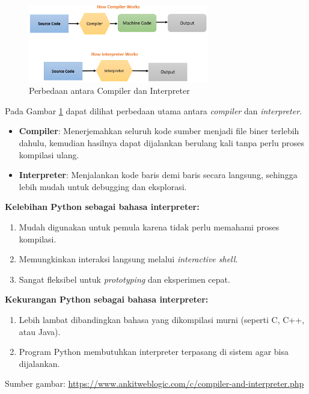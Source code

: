 \begin{figure}[H]
	\centering
	\includegraphics[width=0.7\textwidth]{../shared_assets/images/compiler_vs_interpreter.png}
	\caption{Perbedaan antara Compiler dan Interpreter}
	\label{fig:compiler-vs-interpreter}
\end{figure}

\noindent
Pada Gambar \ref{fig:compiler-vs-interpreter} dapat dilihat perbedaan
utama antara \textit{compiler} dan \textit{interpreter}.  
\begin{itemize}
	\item \textbf{Compiler}: Menerjemahkan seluruh kode sumber menjadi file biner terlebih dahulu, kemudian hasilnya dapat dijalankan berulang kali tanpa perlu proses kompilasi ulang.
	\item \textbf{Interpreter}: Menjalankan kode baris demi baris secara langsung, sehingga lebih mudah untuk debugging dan eksplorasi.
\end{itemize}

\noindent
\textbf{Kelebihan Python sebagai bahasa interpreter:}
\begin{enumerate}
	\item Mudah digunakan untuk pemula karena tidak perlu memahami proses kompilasi.
	\item Memungkinkan interaksi langsung melalui \textit{interactive shell}.
	\item Sangat fleksibel untuk \textit{prototyping} dan eksperimen cepat.
\end{enumerate}

\noindent
\textbf{Kekurangan Python sebagai bahasa interpreter:}
\begin{enumerate}
	\item Lebih lambat dibandingkan bahasa yang dikompilasi murni (seperti C, C++, atau Java).
	\item Program Python membutuhkan interpreter terpasang di sistem agar bisa dijalankan.
\end{enumerate}

\noindent
Sumber gambar: \url{https://www.ankitweblogic.com/c/compiler-and-interpreter.php}

